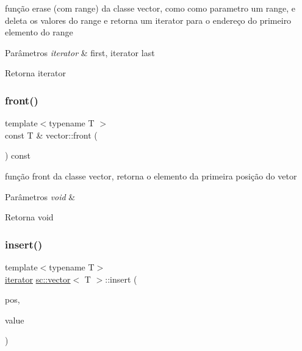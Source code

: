 função erase (com range) da classe vector, como como parametro um range, e deleta os valores do range e retorna um iterator para o endereço do primeiro elemento do range 
\begin{DoxyParams}{Parâmetros}
{\em iterator} & first, iterator last \\
\hline
\end{DoxyParams}
\begin{DoxyReturn}{Retorna}
iterator 
\end{DoxyReturn}
\mbox{\label{classsc_1_1vector_acc1c96630d9a746903411b17240d265d}} 
\subsubsection{\texorpdfstring{front()}{front()}}
{\footnotesize\ttfamily template$<$typename T $>$ \\
const T \& vector\+::front (\begin{DoxyParamCaption}{ }\end{DoxyParamCaption}) const}

função front da classe vector, retorna o elemento da primeira posição do vetor 
\begin{DoxyParams}{Parâmetros}
{\em void} & \\
\hline
\end{DoxyParams}
\begin{DoxyReturn}{Retorna}
void 
\end{DoxyReturn}
\mbox{\label{classsc_1_1vector_ac55608c5cee9a8311cbe7c4fde998a9f}} 
\subsubsection{\texorpdfstring{insert()}{insert()}\hspace{0.1cm}{\footnotesize\ttfamily [1/9]}}
{\footnotesize\ttfamily template$<$typename T$>$ \\
\mbox{\hyperlink{classsc_1_1vector_1_1iterator}{iterator}} \mbox{\hyperlink{classsc_1_1vector}{sc\+::vector}}$<$ T $>$\+::insert (\begin{DoxyParamCaption}\item[{\mbox{\hyperlink{classsc_1_1vector_1_1iterator}{iterator}}}]{pos,  }\item[{const T \&}]{value }\end{DoxyParamCaption})}

